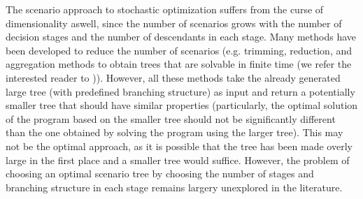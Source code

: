 The scenario approach to stochastic optimization suffers from the curse of dimensionality aswell, since the number of scenarios grows with the number of decision stages and the number of descendants in each stage. Many methods have been developed to reduce the number of scenarios (e.g. trimming, reduction, and aggregation methods to obtain trees that are solvable in finite time (we refer the interested reader to \cite[p. 6]{dupacova_scenarios_for_multistage_stochastic_programs})). However, all these methods take the already generated large tree (with predefined branching structure) as input and return a potentially smaller tree that should have similar properties (particularly, the optimal solution of the program based on the smaller tree should not be significantly different than the one obtained by solving the program using the	 larger tree). This may not be the optimal approach, as it is possible that the tree has been made overly large in the first place and a smaller tree would suffice. However, the problem of choosing an optimal scenario tree by choosing the number of stages and branching structure in each stage remains largery unexplored in the literature. 

